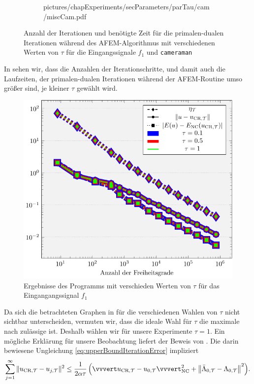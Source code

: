 \begin{figure}[p]
\begin{subfigure}[b]{.48\linewidth}
      {pictures/chapExperiments/secParameters/parTau/cam/miscCam.pdf}
    \label{fig:parTauMiscCam}
  \end{subfigure}
  \caption{Anzahl der Iterationen und benötigte Zeit für die primalen-dualen
    Iterationen während des AFEM-Algorithmus mit verschiedenen Werten von
    $\tau$ für die Eingangssignale $f_1$ und \texttt{cameraman}} 
  \label{fig:parTauMisc}
\end{figure}
In  sehen wir, dass die Anzahlen der Iterationschritte,
und damit auch die Laufzeiten, der primalen-dualen Iterationen während der
AFEM-Routine umso größer sind, je kleiner $\tau$ gewählt wird.
\begin{figure}[p]
  \centering
  \includegraphics[width=.8\linewidth]
    {pictures/chapExperiments/secParameters/parTau/f01/convergenceF.pdf}
  \caption{Ergebnisse des Programms mit verschieden Werten von $\tau$ für das
    Eingangangssignal $f_1$}
  \label{fig:parTauConvergence}
\end{figure}
Da sich die betrachteten Graphen in  für die
verschiedenen Wahlen von $\tau$ nicht sichtbar unterscheiden, vermuten wir,
dass die ideale Wahl für $\tau$ die maximale nach
 zulässige ist.
Deshalb wählen wir für unsere Experimente $\tau=1$.
Ein mögliche Erklärung für unsere Beobachtung liefert der Beweis von
.
Die darin bewiesene Ungleichung \eqref{eq:upperBoundIterationError} impliziert
\begin{align}
  \label{eq:nrIterationsInequality}
  \sum_{j=1}^\infty\Vert \ucrt - \ujt \Vert^2 
  \leq
  \frac{1}{2\alpha\tau}
  \left(\vvvert \ucrt - u_{0,\Tcal}\vvvert^2_\nc 
  + \left\Vert \bar\Lambda_{0,\Tcal} - \Lambda_{0,\Tcal}\right\Vert^2\right)\!. 
\end{align}
